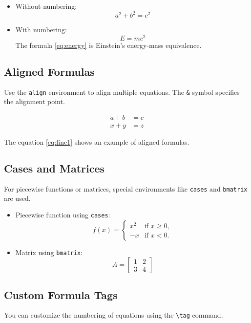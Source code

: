 \documentclass[12pt]{article}
\begin{document}
\begin{itemize}
    \item Without numbering:
    \[
    a^2 + b^2 = c^2
    \]
    \item With numbering:
    \begin{equation}
        E = mc^2
        \label{eq:energy}
    \end{equation}
    The formula \eqref{eq:energy} is Einstein's energy-mass equivalence.
\end{itemize}

\subsection*{Aligned Formulas}
Use the \texttt{align} environment to align multiple equations. The \texttt{\&} symbol specifies the alignment point.

\begin{align}
    a + b &= c \label{eq:line1} \\
    x + y &= z
\end{align}

The equation \eqref{eq:line1} shows an example of aligned formulas.

\subsection*{Cases and Matrices}
For piecewise functions or matrices, special environments like \texttt{cases} and \texttt{bmatrix} are used.

\begin{itemize}
    \item Piecewise function using \texttt{cases}:
    \[
    f(x) =
    \begin{cases} 
        x^2 & \text{if } x \geq 0, \\
        -x  & \text{if } x < 0.
    \end{cases}
    \]
    \item Matrix using \texttt{bmatrix}:
    \[
    A=
    \begin{bmatrix}
        1 & 2 \\
        3 & 4
    \end{bmatrix}
    \]
\end{itemize}

\subsection*{Custom Formula Tags}
You can customize the numbering of equations using the \texttt{\textbackslash tag} command.
\end{document}
